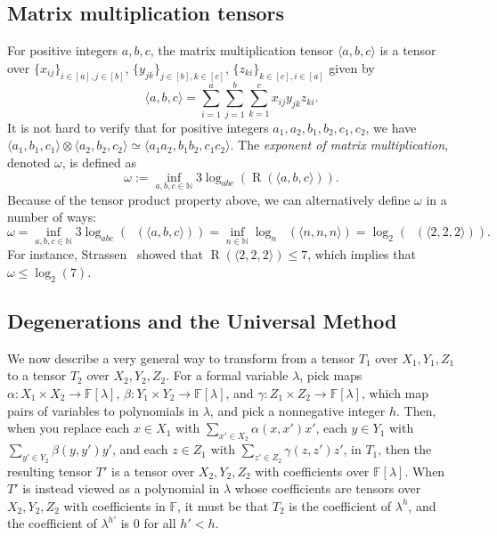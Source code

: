 \documentclass[11pt]{article}
\numberwithin{equation}{section}
\theoremstyle{definition}
\theoremstyle{plain}
\newcommand{\N}{\mathbb N}
\newcommand{\rr}{\mathop{\operatorname{R}}}
\newcommand{\trr}{\mathop{\tilde{\operatorname{R}}}}
\newcommand{\F}{\mathbb{F}}
\theoremstyle{definition}
\begin{document}
%
\subsection{Matrix multiplication tensors}

For positive integers $a,b,c$, the matrix multiplication tensor $\langle a,b,c \rangle$ is a tensor over $\{x_{ij}\}_{i \in [a], j \in [b]}$, $\{y_{jk}\}_{j \in [b], k \in [c]}$, $\{ z_{ki} \}_{k \in [c], i \in [a]}$ given by
$$\langle a,b,c\rangle = \sum_{i=1}^a\sum_{j=1}^b\sum_{k=1}^c x_{ij}y_{jk}z_{ki}.$$
It is not hard to verify that for positive integers $a_1, a_2, b_1, b_2, c_1, c_2$, we have $\langle a_1, b_1, c_1 \rangle \otimes \langle a_2, b_2, c_2 \rangle \simeq \langle a_1 a_2, b_1 b_2, c_1 c_2 \rangle$. The \emph{exponent of matrix multiplication}, denoted $\omega$, is defined as $$\omega := \inf_{a,b,c \in \N} 3 \log_{abc}(\rr(\langle a,b,c \rangle)).$$
Because of the tensor product property above, we can alternatively define $\omega$ in a number of ways:
$$\omega = \inf_{a,b,c \in \N} 3 \log_{abc}(\trr(\langle a,b,c \rangle)) = \inf_{n \in \N} \log_n \trr(\langle n,n,n \rangle) = \log_2(\trr(\langle 2,2,2 \rangle)).$$
For instance, Strassen~\cite{strassen} showed that $\rr(\langle 2,2,2 \rangle) \leq 7$, which implies that $\omega \leq \log_2(7)$.
\subsection{Degenerations and the Universal Method}

We now describe a very general way to transform from a tensor $T_1$ over $X_1, Y_1, Z_1$ to a tensor $T_2$ over $X_2, Y_2, Z_2$. For a formal variable $\lambda$, pick maps $\alpha : X_1 \times X_2 \to \F[\lambda]$, $\beta : Y_1 \times Y_2 \to \F[\lambda]$, and $\gamma : Z_1 \times Z_2 \to \F[\lambda]$, which map pairs of variables to polynomials in $\lambda$, and pick a nonnegative integer $h$. Then, when you replace each $x \in X_1$ with $\sum_{x' \in X_2} \alpha(x,x') x'$, each $y \in Y_1$ with $\sum_{y' \in Y_2} \beta(y,y') y'$, and each $z \in Z_1$ with $\sum_{z' \in Z_2} \gamma(z,z') z'$, in $T_1$, then the resulting tensor $T'$ is a tensor over $X_2, Y_2, Z_2$ with coefficients over $\F[\lambda]$. When $T'$ is instead viewed as a polynomial in $\lambda$ whose coefficients are tensors over $X_2,Y_2,Z_2$ with coefficients in $\F$, it must be that $T_2$ is the coefficient of $\lambda^h$, and the coefficient of $\lambda^{h'}$ is $0$ for all $h'<h$.
\end{document}
